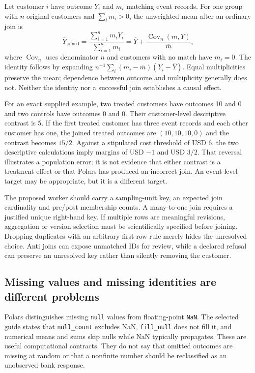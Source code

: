 Let customer $i$ have outcome $Y_i$ and $m_i$ matching event records. For
one group with $n$ original customers and $\sum_i m_i>0$, the unweighted
mean after an ordinary join is
\begin{equation}
 \overline Y_{\mathrm{joined}}
 =\frac{\sum_{i=1}^n m_iY_i}{\sum_{i=1}^n m_i}
 =\overline Y+\frac{\operatorname{Cov}_n(m,Y)}{\overline m},
 \label{eq:exec23-polars-fanout}
\end{equation}
where $\operatorname{Cov}_n$ uses denominator $n$ and customers with no
match have $m_i=0$. The identity follows by expanding
$n^{-1}\sum_i(m_i-\overline m)(Y_i-\overline Y)$. Equal multiplicities
preserve the mean; dependence between outcome and multiplicity generally
does not. Neither the identity nor a successful join establishes a causal
effect.\citep{exec23_polars_reference}

For an exact supplied example, two treated customers have outcomes 10 and
0 and two controls have outcomes 0 and 0. Their customer-level descriptive
contrast is 5. If the first treated customer has three event records and
each other customer has one, the joined treated outcomes are
$(10,10,10,0)$ and the contrast becomes $15/2$. Against a stipulated
cost threshold of USD 6, the two descriptive calculations imply margins
of USD $-1$ and USD $3/2$. That reversal illustrates a population error;
it is not evidence that either contrast is a treatment effect or that
Polars has produced an incorrect join. An event-level target may be
appropriate, but it is a different target.\citep{exec23_polars_reference}

The proposed worker should carry a sampling-unit key, an expected join
cardinality and pre/post membership counts. A many-to-one join requires a
justified unique right-hand key. If multiple rows are meaningful revisions,
aggregation or version selection must be scientifically specified before
joining. Dropping duplicates with an arbitrary first-row rule merely
hides the unresolved choice. Anti joins can expose unmatched IDs for
review, while a declared refusal can preserve an unresolved key rather
than silently removing the customer.

\subsection{Missing values and missing identities are different problems}

Polars distinguishes missing \texttt{null} values from floating-point
\texttt{NaN}. The selected guide states that \texttt{null\_count} excludes
NaN, \texttt{fill\_null} does not fill it, and numerical means and sums
skip nulls while NaN typically propagates. These are useful computational
contracts. They do not say that omitted outcomes are missing at random or
that a nonfinite number should be reclassified as an unobserved bank
response.\citep{exec23_polars_sources}

